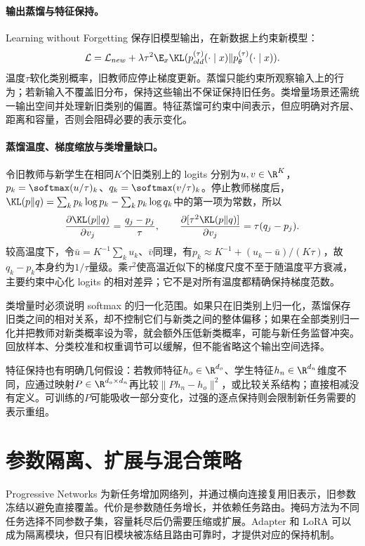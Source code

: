 \paragraph{输出蒸馏与特征保持。}
Learning without Forgetting 保存旧模型输出，在新数据上约束新模型\cite{li2017lwf}：
\begin{equation}
 \mathcal L=\mathcal L_{new}+\lambda\tau^2
 \E_x\KL(p_{old}^{(\tau)}(\cdot\mid x)\|p_\theta^{(\tau)}(\cdot\mid x)).
\end{equation}
温度$\tau$软化类别概率，旧教师应停止梯度更新。蒸馏只能约束所观察输入上的行为；若新输入不覆盖旧分布，保持这些输出不保证保持旧任务。类增量场景还需统一输出空间并处理新旧类别的偏置。特征蒸馏可约束中间表示，但应明确对齐层、距离和容量，否则会阻碍必要的表示变化。

\paragraph{蒸馏温度、梯度缩放与类增量缺口。}
令旧教师与新学生在相同$K$个旧类别上的 logits 分别为$u,v\in\R^K$，$p_k=\softmax(u/\tau)_k$、$q_k=\softmax(v/\tau)_k$。停止教师梯度后，$\KL(p\|q)=\sum_kp_k\log p_k-\sum_kp_k\log q_k$中的第一项为常数，所以
\begin{equation}
 \frac{\partial\KL(p\|q)}{\partial v_j}=\frac{q_j-p_j}{\tau},\qquad
 \frac{\partial[\tau^2\KL(p\|q)]}{\partial v_j}=\tau(q_j-p_j).
\end{equation}
较高温度下，令$\bar u=K^{-1}\sum_ku_k$、$\bar v$同理，有$p_k\approx K^{-1}+(u_k-\bar u)/(K\tau)$，故$q_k-p_k$本身约为$1/\tau$量级。乘$\tau^2$使高温近似下的梯度尺度不至于随温度平方衰减，主要约束中心化 logits 的相对差异；它不是对所有温度都精确保持梯度范数。

类增量时必须说明 softmax 的归一化范围。如果只在旧类别上归一化，蒸馏保存旧类之间的相对关系，却不控制它们与新类之间的整体偏移；如果在全部类别归一化并把教师对新类概率设为零，就会额外压低新类概率，可能与新任务监督冲突。回放样本、分类校准和权重调节可以缓解，但不能省略这个输出空间选择。

特征保持也有明确几何假设：若教师特征$h_o\in\R^{d_o}$、学生特征$h_n\in\R^{d_n}$维度不同，应通过映射$P\in\R^{d_o\times d_n}$再比较$\|Ph_n-h_o\|^2$，或比较关系结构；直接相减没有定义。可训练的$P$可能吸收一部分变化，过强的逐点保持则会限制新任务需要的表示重组。

\section{参数隔离、扩展与混合策略}
Progressive Networks 为新任务增加网络列，并通过横向连接复用旧表示，旧参数冻结以避免直接覆盖\cite{rusu2016progressive}。代价是参数随任务增长，并依赖任务路由。掩码方法为不同任务选择不同参数子集，容量耗尽后仍需要压缩或扩展。Adapter 和 LoRA 可以成为隔离模块，但只有旧模块被冻结且路由可靠时，才提供对应的保持机制。

